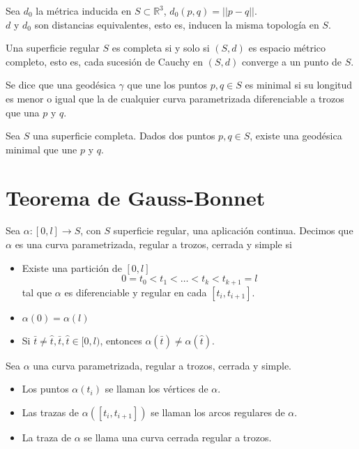 \begin{proposition}
    Sea $d_0$ la métrica inducida en $S \subset \mathbb{R}^3$, $d_0(p, q) = ||p-q||$.\\
    $d$ y $d_0$ son distancias equivalentes, esto es, inducen la misma topología en $S$.
\end{proposition}

\begin{proposition}
    Una superficie regular $S$ es completa si y solo si $(S, d)$ es espacio métrico completo, esto es, cada sucesión de Cauchy en $(S, d)$ converge a un punto de $S$.
\end{proposition}

\begin{definition}
    Se dice que una geodésica $\gamma$ que une los puntos $p, q \in S$ es minimal si su longitud es menor o igual que la de cualquier curva parametrizada diferenciable a trozos que una $p$ y $q$.
\end{definition}

\begin{theorem}
    Sea $S$ una superficie completa.
    Dados dos puntos $p, q \in S$, existe una geodésica minimal que une $p$ y $q$.
\end{theorem}

\section{Teorema de Gauss-Bonnet}

\begin{definition}
    Sea $\alpha: [0, l] \to S$, con $S$ superficie regular, una aplicación continua.
    Decimos que $\alpha$ es una curva parametrizada, regular a trozos, cerrada y simple si
    \begin{itemize}
        \item Existe una partición de $[0, l]$
              $$0 = t_0 < t_1 < \dots < t_k < t_{k+1} = l$$
              tal que $\alpha$ es diferenciable y regular en cada $[t_i, t_{i+1}]$.
        \item $\alpha(0) = \alpha(l)$
        \item Si $\bar{t} \neq \hat{t}, \bar{t}, \hat{t} \in [0, l)$, entonces $\alpha(\bar{t}) \neq \alpha(\hat{t})$.
    \end{itemize}
\end{definition}

\begin{definition}
    Sea $\alpha$ una curva parametrizada, regular a trozos, cerrada y simple.
    \begin{itemize}
        \item Los puntos $\alpha(t_i)$ se llaman los vértices de $\alpha$.
        \item Las trazas de $\alpha([t_i, t_{i+1}])$ se llaman los arcos regulares de $\alpha$.
        \item La traza de $\alpha$ se llama una curva cerrada regular a trozos.
    \end{itemize}
\end{definition}

